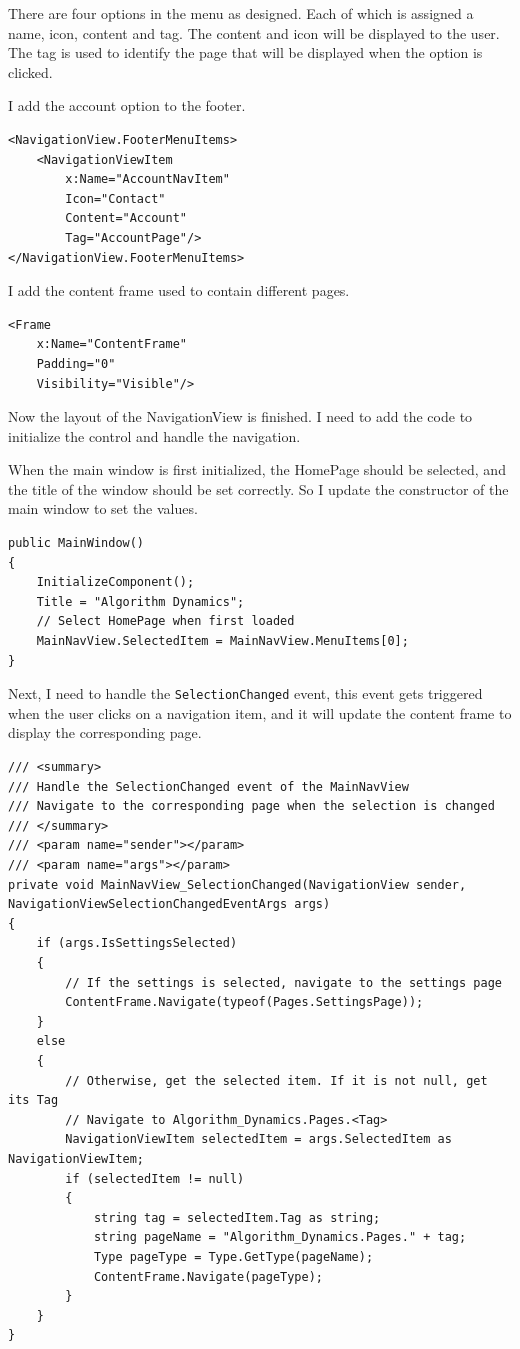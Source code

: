 \documentclass[a4paper]{report}
\begin{document}
There are four options in the menu as designed. Each of which is assigned a name, icon, content and tag. The content and icon will be displayed to the user. The tag is used to identify the page that will be displayed when the option is clicked.

I add the account option to the footer.

\begin{verbatim}
<NavigationView.FooterMenuItems>
    <NavigationViewItem
        x:Name="AccountNavItem"
        Icon="Contact"
        Content="Account"
        Tag="AccountPage"/>
</NavigationView.FooterMenuItems>
\end{verbatim}

I add the content frame used to contain different pages.

\begin{verbatim}
<Frame
    x:Name="ContentFrame"
    Padding="0"
    Visibility="Visible"/>
\end{verbatim}

Now the layout of the NavigationView is finished. I need to add the code to initialize the control and handle the navigation.

When the main window is first initialized, the HomePage should be selected, and the title of the window should be set correctly. So I update the constructor of the main window to set the values.

\begin{verbatim}
public MainWindow()
{
    InitializeComponent();
    Title = "Algorithm Dynamics";
    // Select HomePage when first loaded
    MainNavView.SelectedItem = MainNavView.MenuItems[0];
}
\end{verbatim}

Next, I need to handle the \verb|SelectionChanged| event, this event gets triggered when the user clicks on a navigation item, and it will update the content frame to display the corresponding page.

\begin{verbatim}
/// <summary>
/// Handle the SelectionChanged event of the MainNavView
/// Navigate to the corresponding page when the selection is changed
/// </summary>
/// <param name="sender"></param>
/// <param name="args"></param>
private void MainNavView_SelectionChanged(NavigationView sender, NavigationViewSelectionChangedEventArgs args)
{
    if (args.IsSettingsSelected)
    {
        // If the settings is selected, navigate to the settings page
        ContentFrame.Navigate(typeof(Pages.SettingsPage));
    }
    else
    {
        // Otherwise, get the selected item. If it is not null, get its Tag
        // Navigate to Algorithm_Dynamics.Pages.<Tag>
        NavigationViewItem selectedItem = args.SelectedItem as NavigationViewItem;
        if (selectedItem != null)
        {
            string tag = selectedItem.Tag as string;
            string pageName = "Algorithm_Dynamics.Pages." + tag;
            Type pageType = Type.GetType(pageName);
            ContentFrame.Navigate(pageType);
        }
    }
}
\end{verbatim}
\end{document}

